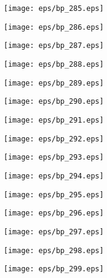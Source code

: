 \documentclass{book}
\begin{document}
	\clearpage\begin{figure}[p]
    \centering
	\texttt{[image: eps/bp\_285.eps]}
	\end{figure}
	\clearpage\begin{figure}[p]
    \centering
	\texttt{[image: eps/bp\_286.eps]}
	\end{figure}
	\clearpage\begin{figure}[p]
    \centering
	\texttt{[image: eps/bp\_287.eps]}
	\end{figure}
	\clearpage\begin{figure}[p]
    \centering
	\texttt{[image: eps/bp\_288.eps]}
	\end{figure}
	\clearpage\begin{figure}[p]
    \centering
	\texttt{[image: eps/bp\_289.eps]}
	\end{figure}
	\clearpage\begin{figure}[p]
    \centering
	\texttt{[image: eps/bp\_290.eps]}
	\end{figure}
	\clearpage\begin{figure}[p]
    \centering
	\texttt{[image: eps/bp\_291.eps]}
	\end{figure}
	\clearpage\begin{figure}[p]
    \centering
	\texttt{[image: eps/bp\_292.eps]}
	\end{figure}
	\clearpage\begin{figure}[p]
    \centering
	\texttt{[image: eps/bp\_293.eps]}
	\end{figure}
	\clearpage\begin{figure}[p]
    \centering
	\texttt{[image: eps/bp\_294.eps]}
	\end{figure}
	\clearpage\begin{figure}[p]
    \centering
	\texttt{[image: eps/bp\_295.eps]}
	\end{figure}
	\clearpage\begin{figure}[p]
    \centering
	\texttt{[image: eps/bp\_296.eps]}
	\end{figure}
	\clearpage\begin{figure}[p]
    \centering
	\texttt{[image: eps/bp\_297.eps]}
	\end{figure}
	\clearpage\begin{figure}[p]
    \centering
	\texttt{[image: eps/bp\_298.eps]}
	\end{figure}
	\clearpage\begin{figure}[p]
    \centering
	\texttt{[image: eps/bp\_299.eps]}
	\end{figure}
\end{document}
